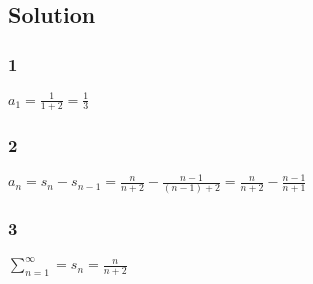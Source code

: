\documentclass[12pt]{article}
\begin{document}
\subsection*{Solution}

\subsubsection*{1}
$a_1 = \frac{1}{1+2} = \frac{1}{3}$

\subsubsection*{2}
$a_n = s_n - s_{n-1} = \frac{n}{n+2} - \frac{n-1}{(n-1)+2} = \frac{n}{n+2} - \frac{n-1}{n+1}$

\subsubsection*{3}
$\sum_{n=1}^\infty = s_n = \frac{n}{n+2}$
\end{document}
